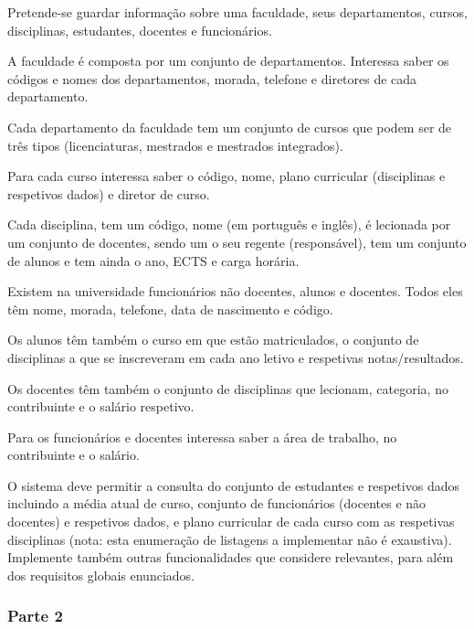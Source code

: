 Pretende-\/se guardar informação sobre uma faculdade, seus departamentos, cursos, disciplinas, estudantes, docentes e funcionários.
\begin{DoxyItemize}
\item A faculdade é composta por um conjunto de departamentos. Interessa saber os códigos e nomes dos departamentos, morada, telefone e diretores de cada departamento.
\item Cada departamento da faculdade tem um conjunto de cursos que podem ser de três tipos (licenciaturas, mestrados e mestrados integrados).
\item Para cada curso interessa saber o código, nome, plano curricular (disciplinas e respetivos dados) e diretor de curso.
\item Cada disciplina, tem um código, nome (em português e inglês), é lecionada por um conjunto de docentes, sendo um o seu regente (responsável), tem um conjunto de alunos e tem ainda o ano, E\+C\+TS e carga horária.
\item Existem na universidade funcionários não docentes, alunos e docentes. Todos eles têm nome, morada, telefone, data de nascimento e código.
\item Os alunos têm também o curso em que estão matriculados, o conjunto de disciplinas a que se inscreveram em cada ano letivo e respetivas notas/resultados.
\item Os docentes têm também o conjunto de disciplinas que lecionam, categoria, no contribuinte e o salário respetivo.
\item Para os funcionários e docentes interessa saber a área de trabalho, no contribuinte e o salário.
\item O sistema deve permitir a consulta do conjunto de estudantes e respetivos dados incluindo a média atual de curso, conjunto de funcionários (docentes e não docentes) e respetivos dados, e plano curricular de cada curso com as respetivas disciplinas (nota\+: esta enumeração de listagens a implementar não é exaustiva). Implemente também outras funcionalidades que considere relevantes, para além dos requisitos globais enunciados.
\end{DoxyItemize}

\subsubsection*{Parte 2}

